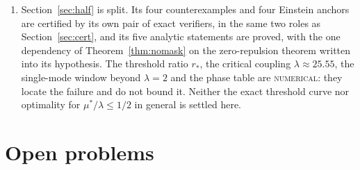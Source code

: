 \documentclass[11pt]{article}
\newcommand{\muS}{\mu^{*}}
\theoremstyle{definition}
\theoremstyle{remark}
\begin{document}
\begin{enumerate}[label=(\arabic*),leftmargin=2.2em]
\item Section~\ref{sec:half} is split. Its four counterexamples and four Einstein anchors
are certified by its own pair of exact verifiers, in the same two roles as
Section~\ref{sec:cert}, and its five analytic statements are proved, with the one
dependency of Theorem~\ref{thm:nomask} on the zero-repulsion theorem written into its
hypothesis. The threshold ratio $r_*$, the
critical coupling $\lambda\approx25.55$, the single-mode window beyond $\lambda=2$ and the
phase table are \textsc{numerical}: they locate the failure and do not bound it. Neither
the exact threshold curve nor optimality for $\muS/\lambda\le1/2$ in general is settled
here.
\end{enumerate}

\section{Open problems}\label{sec:open}
\end{document}
